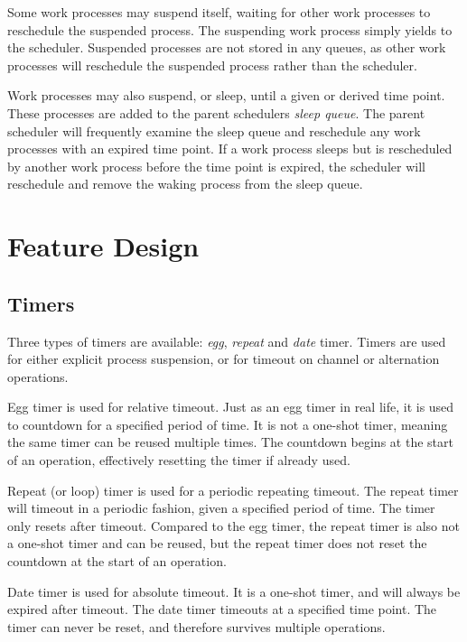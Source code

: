 Some work processes may suspend itself, waiting for other work processes to reschedule the suspended process. The suspending work process simply yields to the scheduler. Suspended processes are not stored in any queues, as other work processes will reschedule the suspended process rather than the scheduler. 

Work processes may also suspend, or sleep, until a given or derived time point. These processes are added to the parent schedulers \textit{sleep queue}. The parent scheduler will frequently examine the sleep queue and reschedule any work processes with an expired time point. If a work process sleeps but is rescheduled by another work process before the time point is expired, the scheduler will reschedule and remove the waking process from the sleep queue.


\section{Feature Design}




\subsection{Timers}
\label{subsec:timers_desgin}


Three types of timers are available: \textit{egg}, \textit{repeat} and \textit{date} timer. Timers are used for either explicit process suspension, or for timeout on channel or alternation operations. 

Egg timer is used for relative timeout. Just as an egg timer in real life, it is used to countdown for a specified period of time. It is not a one\hyp{}shot timer, meaning the same timer can be reused multiple times. The countdown begins at the start of an operation, effectively resetting the timer if already used.

Repeat (or loop) timer is used for a periodic repeating timeout. The repeat timer will timeout in a periodic fashion, given a specified period of time. The timer only resets after timeout. Compared to the egg timer, the repeat timer is also not a one\hyp{}shot timer and can be reused, but the repeat timer does not reset the countdown at the start of an operation.

Date timer is used for absolute timeout. It is a one\hyp{}shot timer, and will always be expired after timeout. The date timer timeouts at a specified time point. The timer can never be reset, and therefore survives multiple operations.


